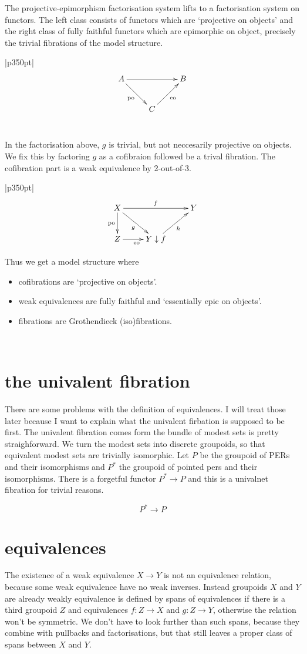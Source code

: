 \documentclass[12pt,a4paper]{article}
\theoremstyle{definition}
\newenvironment{blackboard}{\begin{tabular}{|p{350pt}|}\hline} {\\ \hline \end{tabular} }
\begin{document}
The projective-epimorphism factorisation system lifts to a factorisation system on functors. The left class consists of functors which are `projective on objects' and the right class of fully faithful functors which are epimorphic on object, precisely the trivial fibrations of the model structure.

\begin{blackboard}
\[ \xymatrix{
A\ar[rr]\ar[dr]_{\textrm{po}} && B\\
& C \ar[ur]_{\textrm{eo}}
}\]
\end{blackboard}

In the factorisation above, $g$ is trivial, but not neccesarily projective on objects. We fix this by factoring $g$ as a cofibraion followed be a trival fibration. The cofibration part is a weak equivalence by 2-out-of-3.

\begin{blackboard}
\[ \xymatrix{
X\ar[rr]^f\ar[dr]_g \ar[d]_{\textrm{po}} && Y\\
Z \ar[r]_{\textrm{eo}} & Y\downarrow f \ar[ur]_h
}\]

Thus we get a model structure where
\begin{itemize}
\item cofibrations are `projective on objects'.
\item weak equivalences are fully faithful and `essentially epic on objects'.
\item fibrations are Grothendieck (iso)fibrations.
\end{itemize}
\end{blackboard}

\section{the univalent fibration}
There are some problems with the definition of equivalences. I will treat those later because I want to explain what the univalent firbation is supposed to be first. The univalent fibration comes form the bundle of modest sets is pretty straighforward. We turn the modest sets into discrete groupoids, so that equivalent modest sets are trivially isomorphic.
Let $P$ be the groupoid of PERs and their isomorphisms and $P^*$ the groupoid of pointed pers and their isomorphisms. There is a forgetful functor $P^*\to P$ and this is a univalnet fibration for trivial reasons.

\[ P^* \to P \]

\section{equivalences}
The existence of a weak equivalence $X\to Y$ is not an equivalence relation, because some weak equivalence have no weak inverses. Instead groupoids $X$ and $Y$ are already weakly equivalence is defined by spans of equivalences if there is a third groupoid $Z$ and equivalences $f:Z\to X$ and $g:Z\to Y$, otherwise the relation won't be symmetric. We don't have to look further than such spans, because they combine with pullbacks and factorisations, but that still leaves a proper class of spans between $X$ and $Y$.
\end{document}
